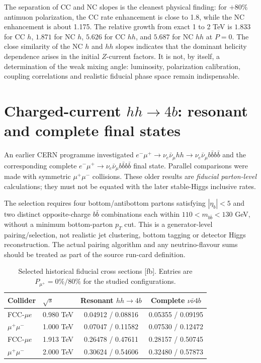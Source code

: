\documentclass[12pt,a4paper]{article}
\newcommand{\newnote}{\clearpage}
\begin{document}
The separation of CC and NC slopes is the cleanest physical finding: for $+80\%$ antimuon polarization, the CC rate enhancement is close to 1.8, while the NC enhancement is about 1.175. The relative growth from exact 1 to 2 TeV is $1.833$ for CC $h$, $1.871$ for NC $h$, $5.626$ for CC $hh$, and $5.687$ for NC $hh$ at $P=0$. The close similarity of the NC $h$ and $hh$ slopes indicates that the dominant helicity dependence arises in the initial $Z$-current factors. It is not, by itself, a determination of the weak mixing angle: luminosity, polarization calibration, coupling correlations and realistic fiducial phase space remain indispensable.



\newnote

\section{Charged-current $hh\to4b$: resonant and complete final states}
An earlier CERN programme investigated $e^-\mu^+\to\nu_e\bar\nu_\mu hh\to\nu_e\bar\nu_\mu b\bar b b\bar b$ and the corresponding complete $e^-\mu^+\to\nu_e\bar\nu_\mu b\bar b b\bar b$ final state. Parallel comparisons were made with symmetric $\mu^+\mu^-$ collisions. These older results are \emph{fiducial parton-level} calculations; they must not be equated with the later stable-Higgs inclusive rates.

The selection requires four bottom/antibottom partons satisfying $|\eta_b|<5$ and two distinct opposite-charge $b\bar b$ combinations each within $110<m_{b\bar b}<130$ GeV, without a minimum bottom-parton $p_T$ cut. This is a generator-level pairing/selection, not realistic jet clustering, bottom tagging or detector Higgs reconstruction. The actual pairing algorithm and any neutrino-flavour sums should be treated as part of the source run-card definition.


\begin{table}[H]
\centering\small
\caption{Selected historical fiducial cross sections [fb]. Entries are $P_{\mu^+}=0\%/80\%$ for the studied configurations.}
\begin{tabular}{@{}llcc@{}}\toprule Collider & $\sqrt{s}$ & Resonant $hh\to4b$ & Complete $\nu\bar\nu4b$\\\midrule
FCC-$\mu e$ & 0.980 TeV & 0.04912 / 0.08816 & 0.05355 / 0.09195\\
$\mu^+\mu^-$ & 1.000 TeV & 0.07047 / 0.11582 & 0.07530 / 0.12472\\
FCC-$\mu e$ & 1.913 TeV & 0.26478 / 0.47611 & 0.28157 / 0.50745\\
$\mu^+\mu^-$ & 2.000 TeV & 0.30624 / 0.54606 & 0.32480 / 0.57873\\\bottomrule
\end{tabular}\end{table}
\end{document}

